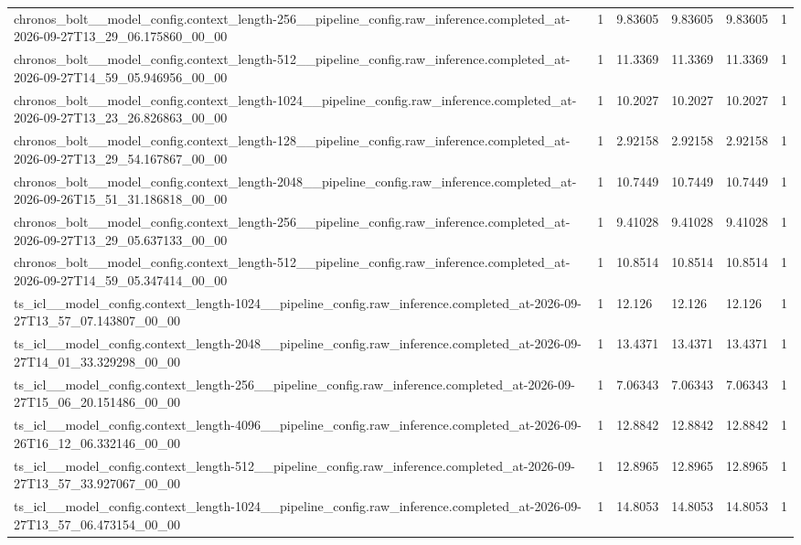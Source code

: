 \begin{tabular}{llllll}
chronos\_bolt\_\_model\_config.context\_length-256\_\_pipeline\_config.raw\_inference.completed\_at-2026-09-27T13\_29\_06.175860\_00\_00 & 1 & 9.83605 & 9.83605 & 9.83605 & 1 \\
chronos\_bolt\_\_model\_config.context\_length-512\_\_pipeline\_config.raw\_inference.completed\_at-2026-09-27T14\_59\_05.946956\_00\_00 & 1 & 11.3369 & 11.3369 & 11.3369 & 1 \\
chronos\_bolt\_\_model\_config.context\_length-1024\_\_pipeline\_config.raw\_inference.completed\_at-2026-09-27T13\_23\_26.826863\_00\_00 & 1 & 10.2027 & 10.2027 & 10.2027 & 1 \\
chronos\_bolt\_\_model\_config.context\_length-128\_\_pipeline\_config.raw\_inference.completed\_at-2026-09-27T13\_29\_54.167867\_00\_00 & 1 & 2.92158 & 2.92158 & 2.92158 & 1 \\
chronos\_bolt\_\_model\_config.context\_length-2048\_\_pipeline\_config.raw\_inference.completed\_at-2026-09-26T15\_51\_31.186818\_00\_00 & 1 & 10.7449 & 10.7449 & 10.7449 & 1 \\
chronos\_bolt\_\_model\_config.context\_length-256\_\_pipeline\_config.raw\_inference.completed\_at-2026-09-27T13\_29\_05.637133\_00\_00 & 1 & 9.41028 & 9.41028 & 9.41028 & 1 \\
chronos\_bolt\_\_model\_config.context\_length-512\_\_pipeline\_config.raw\_inference.completed\_at-2026-09-27T14\_59\_05.347414\_00\_00 & 1 & 10.8514 & 10.8514 & 10.8514 & 1 \\
ts\_icl\_\_model\_config.context\_length-1024\_\_pipeline\_config.raw\_inference.completed\_at-2026-09-27T13\_57\_07.143807\_00\_00 & 1 & 12.126 & 12.126 & 12.126 & 1 \\
ts\_icl\_\_model\_config.context\_length-2048\_\_pipeline\_config.raw\_inference.completed\_at-2026-09-27T14\_01\_33.329298\_00\_00 & 1 & 13.4371 & 13.4371 & 13.4371 & 1 \\
ts\_icl\_\_model\_config.context\_length-256\_\_pipeline\_config.raw\_inference.completed\_at-2026-09-27T15\_06\_20.151486\_00\_00 & 1 & 7.06343 & 7.06343 & 7.06343 & 1 \\
ts\_icl\_\_model\_config.context\_length-4096\_\_pipeline\_config.raw\_inference.completed\_at-2026-09-26T16\_12\_06.332146\_00\_00 & 1 & 12.8842 & 12.8842 & 12.8842 & 1 \\
ts\_icl\_\_model\_config.context\_length-512\_\_pipeline\_config.raw\_inference.completed\_at-2026-09-27T13\_57\_33.927067\_00\_00 & 1 & 12.8965 & 12.8965 & 12.8965 & 1 \\
ts\_icl\_\_model\_config.context\_length-1024\_\_pipeline\_config.raw\_inference.completed\_at-2026-09-27T13\_57\_06.473154\_00\_00 & 1 & 14.8053 & 14.8053 & 14.8053 & 1 \\

\end{tabular}

